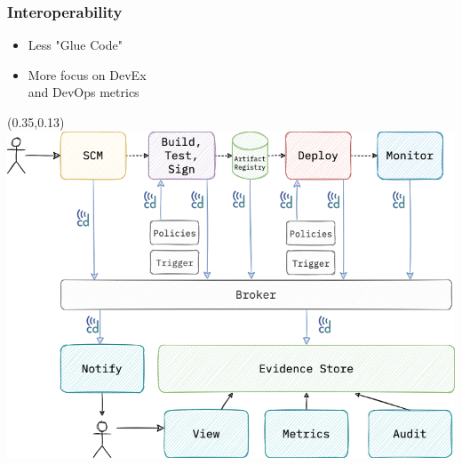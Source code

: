 \documentclass[aspectratio=169,11pt,hyperref={colorlinks=true}]{beamer}
\begin{document}
\begin{grayframe}
  \frametitle{Interoperability}
  \begin{itemize}
    \item Less "Glue Code"
    \item More focus on DevEx \\
          and DevOps metrics
  \end{itemize}
  \begin{textblock*}{0.60\paperwidth}(0.35\paperwidth,0.13\paperheight)
    \includegraphics[width=0.60\paperwidth]{img/cdevents-4-Interoperability.png}
  \end{textblock*}
\end{grayframe}
\end{document}
